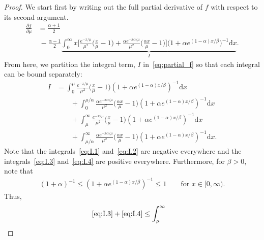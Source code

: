 \documentclass[10pt,a4paper]{amsart}
\newcommand{\diff}{\mathrm{d}}
\begin{document}
\begin{proof}
    We start first by writing out the full partial derivative of $f$ with
    respect to its second argument.
    \begin{align}
      \label{eq:partial_f}
      \frac{\partial f}{\partial \mu}
      &
      = \frac{\alpha +1}{2}
      \\
      & \
      - \frac{\alpha -1}{2}
      \underbrace{\int_0^\infty x
      \Big[
      \frac{e^{-x/\mu}}{\mu^2} \big(\frac{x}{\mu} - 1\big)
      +\frac{\alpha e^{-x\alpha / \mu}}{\mu^2} \big(\frac{\alpha x}{\mu}-1\big)
      \Big]
      \big(1+\alpha e ^{(1-\alpha)x/\beta}\big)^{-1} \diff x}_{I}.
        \nonumber
    \end{align}
    From here, we partition the integral term, $I$ in~\eqref{eq:partial_f}
    so that each integral can be bound separately:
    \begin{align}
      I &=
          \int_0^\mu
          \frac{e^{-x/\mu}}{\mu^2}\Big( \frac{x}{\mu} - 1\Big)
          (1+\alpha e ^{(1-\alpha)x/\beta})^{-1} \diff x
          \tag{I.1}
          \label{eq:I.1}
      \\
        & \qquad
          + \int_0^{\mu / \alpha}
          \frac{\alpha e^{-x \alpha /\mu}}{\mu^2}\Big( \frac{\alpha x}{\mu} - 1\Big)
          (1+\alpha e ^{(1-\alpha)x/\beta})^{-1} \diff x
          \tag{I.2}
          \label{eq:I.2}
      \\ & \qquad
           +\int_\mu^\infty
           \frac{e^{-x/\mu}}{\mu^2} \Big( \frac{x}{\mu} - 1\Big)
           (1+\alpha e ^{(1-\alpha)x/\beta})^{-1} \diff x
           \tag{I.3}
           \label{eq:I.3}
      \\
        & \qquad
          + \int_{\mu / \alpha}^\infty
          \frac{\alpha e^{-x \alpha /\mu}}{\mu^2}\Big( \frac{\alpha x}{\mu} - 1\Big)
          (1+\alpha e ^{(1-\alpha)x/\beta})^{-1} \diff x.
          \label{eq:I.4}
          \tag{I.4}
    \end{align}
    Note that the integrals~\eqref{eq:I.1} and~\eqref{eq:I.2} are negative
    everywhere and the integrals~\eqref{eq:I.3} and~\eqref{eq:I.4} are positive
    everywhere. Furthermore, for $\beta>0$, note that
    \begin{align*}
      (1+\alpha)^{-1}
      \leq (1 + \alpha e^{(1-\alpha)x / \beta})^{-1}
      \leq 1
      \qquad
      \text{for } x \in [0, \infty).
    \end{align*}
    Thus,
    \begin{align*}
        \eqref{eq:I.3} +\eqref{eq:I.4}
      &\leq \int_\mu^\infty

\end{align*}
\end{proof}
\end{document}
